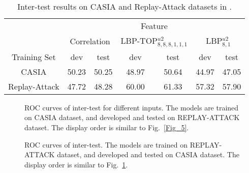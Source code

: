 \documentclass[letterpaper, 10 pt, conference]{ieeeconf}
\begin{document}
\begin{table}[!htb]
\caption{Inter-test results on CASIA and Replay-Attack datasets in \cite{Face_Anti_Spoofing_Pereira_2013}.}
\label{TB_INTER_PREVIOUS}
\centering
\begin{tabular}{|c|c|c|c|c|c|c|}
\cline{2-7}
\multicolumn{1}{c|}{}      & \multicolumn{6}{c|}{Feature}     \\
\cline{2-7}
\multicolumn{1}{c|}{}      & \multicolumn{2}{c|}{Correlation} & \multicolumn{2}{c|}{LBP-TOP$^{u2}_{8,8,8,1,1,1}$} & \multicolumn{2}{c|}{LBP$^{u2}_{8, 1}$} \\
       \hline
Training Set       & dev & test & dev & test & dev & test \\
       \hline
CASIA   & 50.23 & 50.25 & 48.97 & 50.64 & 44.97 & 47.05 \\
\hline
Replay-Attack  & 47.72 & 48.28 & 60.00 & 61.33 & 57.32 & 57.90 \\
\hline
\end{tabular}
\end{table}

\begin{figure*}
\begin{minipage}[b]{0.3\linewidth}
\centering
\centerline{}
\end{minipage}
\hfill
\begin{minipage}[b]{0.3\linewidth}
\centering
\centerline{}
\end{minipage}
\hfill
\begin{minipage}[b]{0.3\linewidth}
\centering
\centerline{}
\end{minipage}
\caption{ROC curves of inter-test for different inputs. The models are trained on CASIA dataset, and developed and tested on REPLAY-ATTACK dataset. The display order is similar to Fig.~\ref{Fig_5}.}
\label{Fig_7}
\end{figure*}

\begin{figure*}
\begin{minipage}[b]{0.3\linewidth}
\centering
\centerline{}
\end{minipage}
\hfill
\begin{minipage}[b]{0.3\linewidth}
\centering
\centerline{}
\end{minipage}
\hfill
\begin{minipage}[b]{0.3\linewidth}
\centering
\centerline{}
\end{minipage}
\caption{ROC curves of inter-test. The models are trained on REPLAY-ATTACK dataset, and developed and tested on CASIA dataset. The display order is similar to Fig.~\ref{Fig_7}.}
\label{Fig_8}
\end{figure*}
\end{document}

